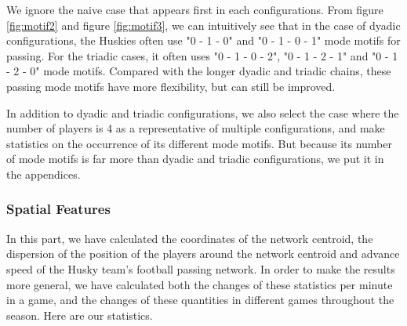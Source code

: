 \documentclass{mcmthesis}
\begin{document}
	We ignore the naive case that appears first in each configurations.  From figure \ref{fig:motif2} and figure \ref{fig:motif3}, we can intuitively see that in the case of dyadic configurations, the Huskies often use "0 - 1 - 0" and "0 - 1 - 0 - 1" mode motifs for passing.  For the triadic cases, it often uses "0 - 1 - 0 - 2", "0 - 1 - 2 - 1" and "0 - 1 - 2 - 0" mode motifs.  Compared with the longer dyadic and triadic chains, these passing mode motifs have more flexibility, but  can still be improved.

	In addition to dyadic and triadic configurations, we also select the case where the number of players is 4 as a representative of multiple configurations, and make statistics on the occurrence of its different mode motifs.  But because its number of mode motifs is far more than dyadic and triadic configurations, we put it in the appendices.
\subsubsection{Spatial Features}
	In this part, we have calculated the coordinates of the network centroid, the dispersion of the position of the players around the network centroid and advance speed of the Husky team's football passing network.  In order to make the results more general, we have calculated both the changes of these statistics per minute in a game, and the changes of these quantities in different games throughout the season.  Here are our statistics.
\end{document}

